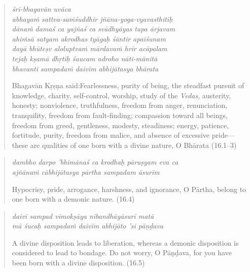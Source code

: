 \documentclass[12pt, twoside, openright]{memoir}
\begin{document}
\par
\begin{verse}
\textit{śrī-bhagavān uvāca} \\
\textit{abhayaṁ sattva-saṁśuddhir jñāna-yoga-vyavasthitiḥ} \\
\textit{dānaṁ damaś ca yajñaś ca svādhyāyas tapa ārjavam} \\
\textit{ahiṁsā satyam akrodhas tyāgaḥ śāntir apaiśunam} \\
\textit{dayā bhūteṣv aloluptvaṁ mārdavaṁ hrīr acāpalam} \\
\textit{tejaḥ kṣamā dhṛtiḥ śaucam adroho nāti-mānitā} \\
\textit{bhavanti sampadaṁ daivīm abhijātasya bhārata}

\noindent \quad Bhagavān Kṛṣṇa said:\linebreak Fearlessness, purity of being, the steadfast pursuit of knowledge, charity, self-control, worship, study of the \textit{Vedas}, austerity, honesty; nonviolence, truthfulness, freedom from anger, renunciation, tranquility, freedom from fault-finding; compassion toward all beings, freedom from greed, gentleness, modesty, steadiness; energy, patience, fortitude, purity, freedom from malice, and absence of excessive pride---these are qualities of one born with a divine nature, O Bhārata (16.1–3)
\end{verse}
\par



\par
\begin{verse}
\textit{dambho darpo ’bhimānaś ca krodhaḥ pāruṣyam eva ca} \\
\textit{ajñānaṁ cābhijātasya pārtha sampadam āsurīm}

\noindent Hypocrisy, pride, arrogance, harshness, and ignorance, O Pārtha, belong to one born with a demonic nature. (16.4)
\end{verse}
\par



\par
\begin{verse}
\textit{daivī sampad vimokṣāya nibandhāyāsurī matā} \\
\textit{mā śucaḥ sampadaṁ daivīm abhijāto ’si pāṇḍava}

\noindent A divine disposition leads to liberation, whereas a demonic disposition is considered to lead to bondage. Do not worry, O Pāṇḍava, for you have been born with a divine disposition. (16.5)
\end{verse}
\par
\end{document}

